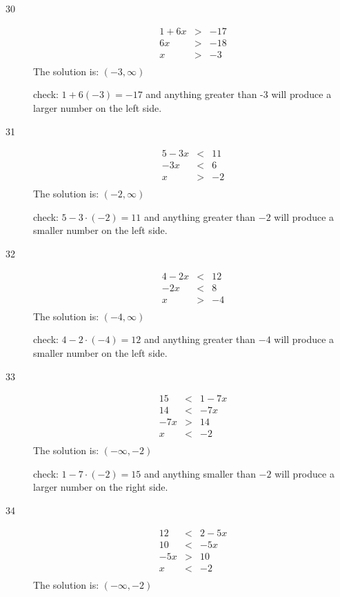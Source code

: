 \documentclass[fleqn,addpoints]{exam}
\begin{document}
\begin{description}

\item[30]
\begin{eqnarray*}
  1 + 6x & > & -17 \\
  6x & > & -18 \\
  x & > & -3 \\
\end{eqnarray*}
The solution is: \( (-3, \infty) \)

check: \( 1 + 6(-3) = -17\) and anything greater than -3 will produce a larger number on the left side.

\item[31]
\begin{eqnarray*}
  5 - 3x &<& 11 \\
  -3x &<& 6 \\
  x &>& -2 \\
\end{eqnarray*}
The solution is: \( (-2, \infty) \)

check: \( 5 - 3 \cdot (-2) = 11\) and anything greater than $-2$ will produce a smaller number on the left side.

\item[32]
\begin{eqnarray*}
  4 - 2x &<& 12 \\
  -2x &<& 8 \\
  x &>& -4 \\
\end{eqnarray*}
The solution is: \( (-4, \infty) \)

check: \( 4 - 2 \cdot (-4) = 12\) and anything greater than $-4$ will produce a smaller number on the left side.

\item[33]
\begin{eqnarray*}
  15 &<& 1 - 7x \\
  14 &<& -7x \\
  -7x &>& 14 \\
  x &<& -2 \\
\end{eqnarray*}
The solution is: \( (-\infty, -2) \)

check: \( 1 - 7 \cdot (-2) = 15\) and anything smaller than $-2$ will produce a larger number on the right side.

\item[34]
\begin{eqnarray*}
  12 &<& 2 - 5x \\
  10 &<& -5x \\
  -5x &>& 10 \\
  x &<& -2 \\
\end{eqnarray*}
The solution is: \( (-\infty, -2) \)


\end{description}
\end{document}

